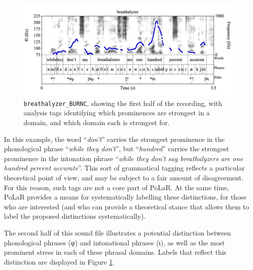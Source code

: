 \documentclass[11pt, twoside]{memoir}
\def\langtext#1{\textit{#1}}
\begin{document}
\begin{figure}[H]
\centering
%
\includegraphics[width=.875\linewidth]{PrStr-breathalyzer-1-adv.png}
%
\caption[\texttt{breathalyzer\_BURNC}, with analysis tags identifying which prominences are strongest in a domain, and which domain each is strongest for.]{\texttt{breathalyzer\_BURNC}, showing the first half of the recording, with analysis tags identifying which prominences are strongest in a domain, and which domain each is strongest for.%
\label{fig:breathalyzer Beyond}%
}
\end{figure}

In this example, the word “\langtext{don’t}” carries the strongest prominence in the phonological phrase “\langtext{while they don’t}”, but “\langtext{hundred}” carries the strongest prominence in the intonation phrase “\langtext{while they don’t say breathalyzers are one hundred percent accurate}”. This sort of grammatical tagging reflects a particular theoretical point of view, and may be subject to a fair amount of disagreement. For this reason, such tags are not a core part of PoLaR. At the same time, PoLaR provides a means for systematically labelling these distinctions, for those who are interested (and who can provide a theoretical stance that allows them to label the proposed  distinctions systematically).

The second half of this sound file illustrates a potential distinction between phonological phrases (φ) and intonational phrases (ι), as well as the most prominent stress in each of these phrasal domains. Labels that reflect this distinction are displayed in Figure \ref{fig:breathalyzer Beyond}.
\end{document}
